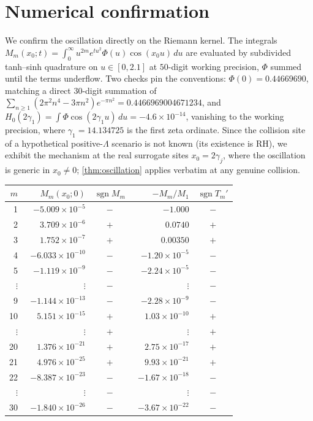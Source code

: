 \documentclass[11pt,reqno]{amsart}
\theoremstyle{plain}
\theoremstyle{definition}
\theoremstyle{remark}
\DeclareMathOperator{\sgn}{sgn}
\begin{document}
\section{Numerical confirmation}\label{sec:numerics}

We confirm the oscillation directly on the Riemann kernel. The integrals
$M_m(x_0;t)=\int_0^\infty u^{2m}e^{tu^2}\Phi(u)\cos(x_0u)\,du$ are evaluated
by subdivided tanh--sinh quadrature on $u\in[0,2.1]$ at $50$-digit working
precision, $\Phi$ summed until the terms underflow. Two checks pin the
conventions: $\Phi(0)=0.44669690$, matching a direct $30$-digit summation of
$\sum_{n\ge1}(2\pi^2n^4-3\pi n^2)e^{-\pi n^2}=0.4466969004671234$, and
$H_0(2\gamma_1)=\int\Phi\cos(2\gamma_1u)\,du=-4.6\times10^{-14}$, vanishing
to the working precision, where $\gamma_1=14.134725$ is the first zeta
ordinate. Since the collision site of a hypothetical positive-$\Lambda$
scenario is not known (its existence is RH), we exhibit the mechanism at the
real surrogate sites $x_0=2\gamma_j$, where the oscillation is generic in
$x_0\neq0$; \cref{thm:oscillation} applies verbatim at any genuine
collision.

\begin{center}
\begin{tabular}{rrcrc}
\toprule
$m$ & $M_m(x_0;0)$ & $\sgn M_m$ & $-M_m/M_1$ & $\sgn T_m'$\\
\midrule
1  & $-5.009\times10^{-5}$ & $-$ & $-1.000$            & $-$\\
2  & $\phantom{-}3.709\times10^{-6}$ & $+$ & $\phantom{-}0.0740$ & $+$\\
3  & $\phantom{-}1.752\times10^{-7}$ & $+$ & $\phantom{-}0.00350$ & $+$\\
4  & $-6.033\times10^{-10}$ & $-$ & $-1.20\times10^{-5}$ & $-$\\
5  & $-1.119\times10^{-9}$ & $-$ & $-2.24\times10^{-5}$ & $-$\\
$\vdots$ & $\vdots$ & $-$ & $\vdots$ & $-$\\
9  & $-1.144\times10^{-13}$ & $-$ & $-2.28\times10^{-9}$ & $-$\\
10 & $\phantom{-}5.151\times10^{-15}$ & $+$ & $\phantom{-}1.03\times10^{-10}$ & $+$\\
$\vdots$ & $\vdots$ & $+$ & $\vdots$ & $+$\\
20 & $\phantom{-}1.376\times10^{-21}$ & $+$ & $\phantom{-}2.75\times10^{-17}$ & $+$\\
21 & $\phantom{-}4.976\times10^{-25}$ & $+$ & $\phantom{-}9.93\times10^{-21}$ & $+$\\
22 & $-8.387\times10^{-23}$ & $-$ & $-1.67\times10^{-18}$ & $-$\\
$\vdots$ & $\vdots$ & $-$ & $\vdots$ & $-$\\
30 & $-1.840\times10^{-26}$ & $-$ & $-3.67\times10^{-22}$ & $-$\\
\bottomrule
\end{tabular}
\end{center}
\end{document}
